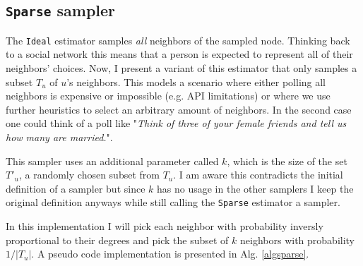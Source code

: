 \subsection{\texttt{Sparse} sampler}
The \texttt{Ideal} estimator samples \textit{all} neighbors of the sampled node. Thinking back to a social network this means that a person is expected to represent all of their neighbors' choices.
Now, I present a variant of this estimator that only samples a subset $T_u$ of $u$'s neighbors.
This models a scenario where either polling all neighbors is expensive or impossible (e.g. API limitations) or where we use further heuristics to select an arbitrary amount of neighbors. In the second case one could think of a poll like "\textit{Think of three of your female friends and tell us how many are married.}".

This sampler uses an additional parameter called $k$, which is the size of the set $T'_u$, a randomly chosen subset from $T_u$.
I am aware this contradicts the initial definition of a sampler but since $k$ has no usage in the other samplers I keep the original definition anyways while still calling the \texttt{Sparse} estimator a sampler.

In this implementation I will pick each neighbor with probability inversly proportional to their degrees and pick the subset of $k$ neighbors with probability $1/|T_u|$.
A pseudo code implementation is presented in Alg. \ref{algsparse}.

